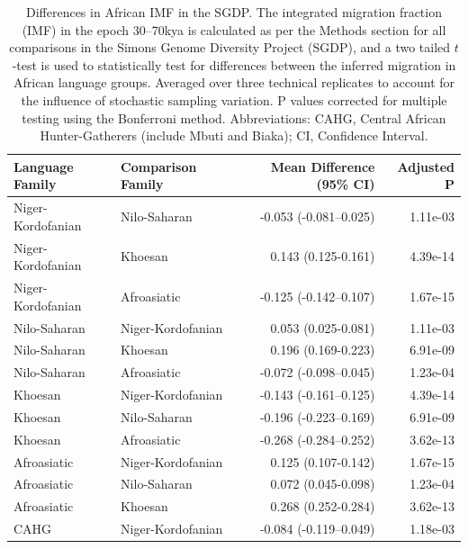\begin{table}[ht]
  \centering
  \begin{tabular}{llrr}
    \hline
  Language Family & Comparison Family & Mean Difference (95\% CI) & Adjusted P \\ 
    \hline
  Niger-Kordofanian & Nilo-Saharan & -0.053 (-0.081--0.025) & 1.11e-03 \\ 
    Niger-Kordofanian & Khoesan & 0.143 (0.125-0.161) & 4.39e-14 \\ 
    Niger-Kordofanian & Afroasiatic & -0.125 (-0.142--0.107) & 1.67e-15 \\ 
    Nilo-Saharan & Niger-Kordofanian & 0.053 (0.025-0.081) & 1.11e-03 \\ 
    Nilo-Saharan & Khoesan & 0.196 (0.169-0.223) & 6.91e-09 \\ 
    Nilo-Saharan & Afroasiatic & -0.072 (-0.098--0.045) & 1.23e-04 \\ 
    Khoesan & Niger-Kordofanian & -0.143 (-0.161--0.125) & 4.39e-14 \\ 
    Khoesan & Nilo-Saharan & -0.196 (-0.223--0.169) & 6.91e-09 \\ 
    Khoesan & Afroasiatic & -0.268 (-0.284--0.252) & 3.62e-13 \\ 
    Afroasiatic & Niger-Kordofanian & 0.125 (0.107-0.142) & 1.67e-15 \\ 
    Afroasiatic & Nilo-Saharan & 0.072 (0.045-0.098) & 1.23e-04 \\ 
    Afroasiatic & Khoesan & 0.268 (0.252-0.284) & 3.62e-13 \\ 
    CAHG & Niger-Kordofanian & -0.084 (-0.119--0.049) & 1.18e-03 \\ 
     \hline
  \end{tabular}
  \caption[Tests for significance between integrated migration fractions within African populations in the SGDP]{ Differences in African IMF in the SGDP. The integrated migration fraction (IMF) in the epoch 30--70kya is calculated as per the Methods section for all comparisons in the Simons Genome Diversity Project (SGDP), and a two tailed $t$-test is used to statistically test for differences between the inferred migration in African language groups. Averaged over three technical replicates to account for the influence of stochastic sampling variation. P values corrected for multiple testing using the Bonferroni method. Abbreviations: CAHG, Central African Hunter-Gatherers (include Mbuti and Biaka); CI, Confidence Interval.} 
  \label{table:sgdp_pairwise}
  \end{table}


